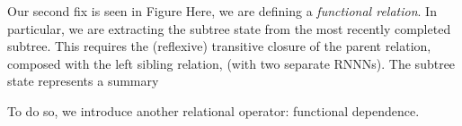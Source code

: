 Our second fix is seen in Figure %
Here, we are defining a \textit{functional relation}. In particular, we are 
extracting the subtree state from the most recently completed subtree. This 
requires the (reflexive) transitive closure of the parent relation, composed 
with the left sibling relation, (with two separate RNNNs).  The subtree state 
represents a summary


To do so, we introduce another relational operator: functional dependence.











